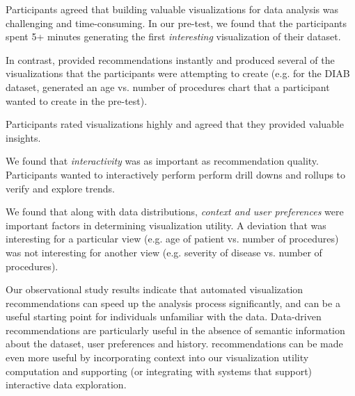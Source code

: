 \begin{denselist}
\item Participants agreed that building valuable visualizations for data analysis was challenging and time-consuming. In our pre-test, we found that the participants spent 5+ minutes generating the first {\it interesting} visualization of their dataset.
\item In contrast, \SeeDB provided recommendations instantly and produced several of the visualizations that the participants were attempting to create (e.g. for the DIAB dataset, \SeeDB generated an age vs. number of procedures chart that a participant wanted to create in the pre-test).
\item Participants rated \SeeDB visualizations highly and agreed that they provided valuable insights. 
\item We found that {\it interactivity} was as important as recommendation quality. Participants wanted to interactively perform perform drill downs and rollups to verify and explore trends.
\item We found that along with data distributions, {\it context and user preferences}  were  important factors in determining visualization utility. A deviation that was interesting for a particular view (e.g. age of patient vs. number of procedures) was not interesting for another view (e.g. severity of disease vs. number of procedures). 
\end{denselist}

\noindent Our observational study results indicate that automated visualization recommendations can speed up the analysis process significantly, and can be a useful starting point for individuals unfamiliar with the data.
Data-driven recommendations are particularly useful in the absence of semantic information about the dataset, user preferences and history.
\SeeDB recommendations can be made even more useful by incorporating context into our visualization utility computation and supporting (or integrating with systems that support) interactive data exploration.



